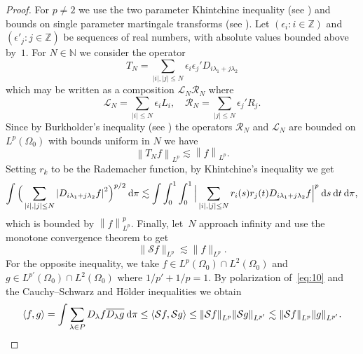 \documentclass[a4paper]{amsart}
\newcommand{\sprod}[2]{{\langle #1, #2\rangle}}
\newcommand{\norm}[1]{{\left\lVert #1 \right\rVert}}
\newcommand{\abs}[1]{{\lvert {#1} \rvert}}
\newcommand{\seq}[2]{\left({#1}: {#2}\right)}
\newcommand{\dpi}{{\: \rm d}\pi}
\newcommand{\ZZ}{\mathbb{Z}}
\newcommand{\NN}{\mathbb{N}}
\newcommand{\calS}{\mathcal{S}}
\theoremstyle{plain}
\theoremstyle{definition}
\theoremstyle{remark}
\numberwithin{equation}{section}
\theoremstyle{plain}
\begin{document}
\begin{proof}
For $p \neq 2$ we use the two parameter Khintchine inequality (see
\cite{pal}) and bounds on single parameter martingale transforms (see
\cite{burk1, stein1, weisz}). Let $\seq{\epsilon_i}{i \in \ZZ}$ and
$(\epsilon'_j : j \in \ZZ)$ be sequences of real numbers, with
absolute values bounded above by~$1$. For $N \in \NN$ we consider the
operator
\begin{equation*}
  T_N = \sum_{\abs{i}, \abs{j} \leq N} \epsilon_i \epsilon_j' D_{i\lambda_1 + j \lambda_2}
\end{equation*}
which may be written as a composition $\mathcal{L}_N \mathcal{R}_N$
where
\begin{equation*}
  \mathcal{L}_N = \sum_{\abs{i} \leq N} \epsilon_i L_i, \quad
  \mathcal{R}_N = \sum_{\abs{j} \leq N} \epsilon_j' R_j.
\end{equation*}
Since by Burkholder's inequality (see \cite{burk1, stein1}) the
operators $\mathcal{R}_N$ and 
$\mathcal{L}_N$ are bounded on
$L^p(\Omega_0)$ with bounds uniform in $N$ we have
\begin{equation*}
	\norm{T_N f}_{L^p} \lesssim \norm{f}_{L^p}.
\end{equation*}
Setting $r_k$ to be the Rademacher function, by Khintchine's
inequality we get
\begin{equation*}
  \int 
  \Big(\sum_{\abs{i}, \abs{j} \leq N}
  \abs{D_{i\lambda_1 + j \lambda_2} f}^2 \Big)^{p/2} \dpi
  \lesssim
  \int
  \int_0^1 \int_0^1
  \Big\lvert
  \sum_{\abs{i}, \abs{j} \leq N}
  r_i(s) r_j(t) D_{i \lambda_1 +j \lambda_2} f
  \Big\rvert^p {\: \rm d}s{\: \rm d} t \dpi,
\end{equation*}
which is bounded by $\norm{f}_{L^p}^p$. Finally, let~$N$ approach infinity and use the monotone convergence
theorem to get
\begin{equation*}
  \lVert \calS f \rVert_{L^p} \lesssim \lVert f \rVert_{L^p}.
\end{equation*}
For the opposite inequality, we take $f \in L^p(\Omega_0) \cap
L^2(\Omega_0)$ and $g \in L^{p'}(\Omega_0) \cap L^2(\Omega_0)$ where
$1/p'+1/p = 1$. By polarization of~\eqref{eq:10} and the
Cauchy--Schwarz and H\"older inequalities we obtain
\begin{equation*}
  \sprod{f}{g} = \int \sum_{\lambda \in P} D_\lambda f \overline{D_\lambda g} \dpi
  \leq
  \langle \calS f, \calS g \rangle \leq \norm{\calS f}_{L^p} \norm{\calS g}_{L^{p'}}
  \lesssim 
  \norm{\calS f}_{L^p}
  \norm{g}_{L^{p'}}. \qedhere
\end{equation*}
\end{proof}
\end{document}
